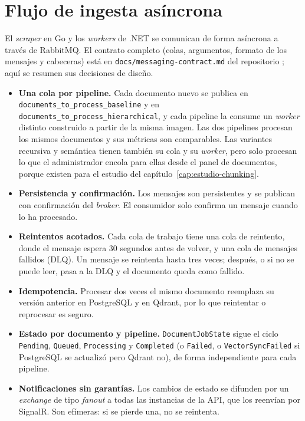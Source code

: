 \section{Flujo de ingesta asíncrona}
\label{sec:ingesta-diseno}

El \emph{scraper} en Go y los \emph{workers} de .NET se comunican de forma asíncrona a través de RabbitMQ. El contrato completo (colas, argumentos, formato de los mensajes y cabeceras) está en \texttt{docs/messaging-contract.md} del repositorio \cite{repositorio}; aquí se resumen sus decisiones de diseño.

\begin{itemize}
  \item \textbf{Una cola por pipeline.} Cada documento nuevo se publica en \texttt{documents\_to\_\allowbreak process\_\allowbreak baseline} y en \texttt{documents\_to\_\allowbreak process\_\allowbreak hierarchical}, y cada pipeline la consume un \emph{worker} distinto construido a partir de la misma imagen. Las dos pipelines procesan los mismos documentos y sus métricas son comparables. Las variantes recursiva y semántica tienen también su cola y su \emph{worker}, pero solo procesan lo que el administrador encola para ellas desde el panel de documentos, porque existen para el estudio del capítulo~\ref{cap:estudio-chunking}.
  \item \textbf{Persistencia y confirmación.} Los mensajes son persistentes y se publican con confirmación del \emph{broker}. El consumidor solo confirma un mensaje cuando lo ha procesado.
  \item \textbf{Reintentos acotados.} Cada cola de trabajo tiene una cola de reintento, donde el mensaje espera 30 segundos antes de volver, y una cola de mensajes fallidos (DLQ). Un mensaje se reintenta hasta tres veces; después, o si no se puede leer, pasa a la DLQ y el documento queda como fallido.
  \item \textbf{Idempotencia.} Procesar dos veces el mismo documento reemplaza su versión anterior en PostgreSQL y en Qdrant, por lo que reintentar o reprocesar es seguro.
  \item \textbf{Estado por documento y pipeline.} \texttt{DocumentJobState} sigue el ciclo \texttt{Pending}, \texttt{Queued}, \texttt{Processing} y \texttt{Completed} (o \texttt{Failed}, o \texttt{VectorSyncFailed} si PostgreSQL se actualizó pero Qdrant no), de forma independiente para cada pipeline.
  \item \textbf{Notificaciones sin garantías.} Los cambios de estado se difunden por un \emph{exchange} de tipo \emph{fanout} a todas las instancias de la API, que los reenvían por SignalR. Son efímeras: si se pierde una, no se reintenta.
\end{itemize}

